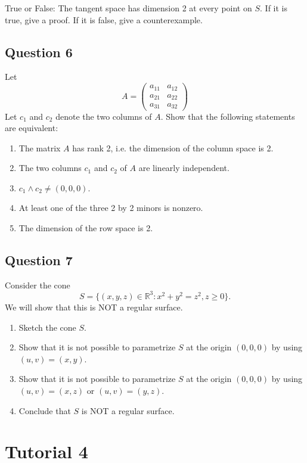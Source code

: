 \documentclass[12pt, a4paper]{article}
\newcommand{\R}{\mathbb{R}}
\begin{document}
True or False: The tangent space has dimension 2 at every point on $S$. If it is true, give a proof. If it is false, give a counterexample.
\newpage

\subsection*{Question 6}
Let 
\[ A=\begin{pmatrix}a_{11}&a_{12}\\ a_{21}&a_{22}\\ a_{31}&a_{32}\end{pmatrix} \]
Let $c_{1}$ and $c_{2}$ denote the two columns of $A$. Show that the following statements are equivalent:
\begin{enumerate}[label=(\roman*)]
    \item The matrix $A$ has rank 2, i.e. the dimension of the column space is 2.
    \item The two columns $c_{1}$ and $c_{2}$ of $A$ are linearly independent.
    \item $c_{1}\wedge c_{2}\ne(0,0,0)$.
    \item At least one of the three 2 by 2 minors is nonzero.
    \item The dimension of the row space is 2.
\end{enumerate}
\newpage

\subsection*{Question 7}
Consider the cone
\[ S=\{(x,y,z)\in\R^{3}:x^{2}+y^{2}=z^{2}, z\ge0\}. \]
We will show that this is NOT a regular surface.
\begin{enumerate}[label=(\roman*)]
    \item Sketch the cone $S$.
    \item Show that it is not possible to parametrize $S$ at the origin $(0,0,0)$ by using $(u,v)=(x,y)$.
    \item Show that it is not possible to parametrize $S$ at the origin $(0, 0, 0)$ by using $(u,v)=(x,z)$ or $(u,v)=(y,z)$.
    \item Conclude that $S$ is NOT a regular surface.
\end{enumerate}
\newpage

\section*{Tutorial 4}
\end{document}
